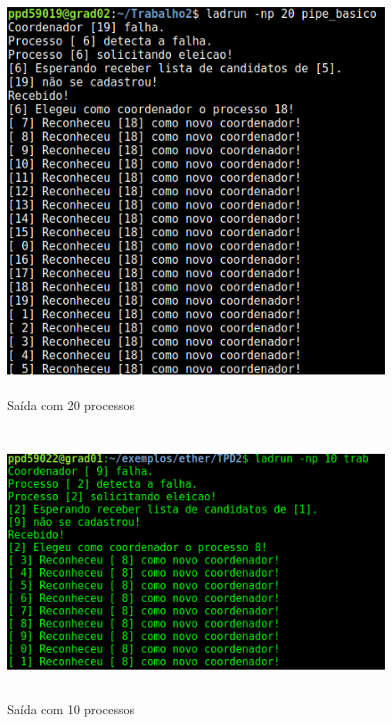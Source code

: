 \documentclass{article}
\begin{document}
\newpage



\newpage

\begin{figure}[H]
            \centering
            \includegraphics[width=13cm, height=12cm]{exemplo_saida.png}
            \caption{Saída com 20 processos}
\end{figure}

\begin{figure}[H]
            \centering
            \includegraphics[width=13cm, height=8cm]{ex_10.png}
            \caption{Saída com 10 processos}
\end{figure}
\end{document}
